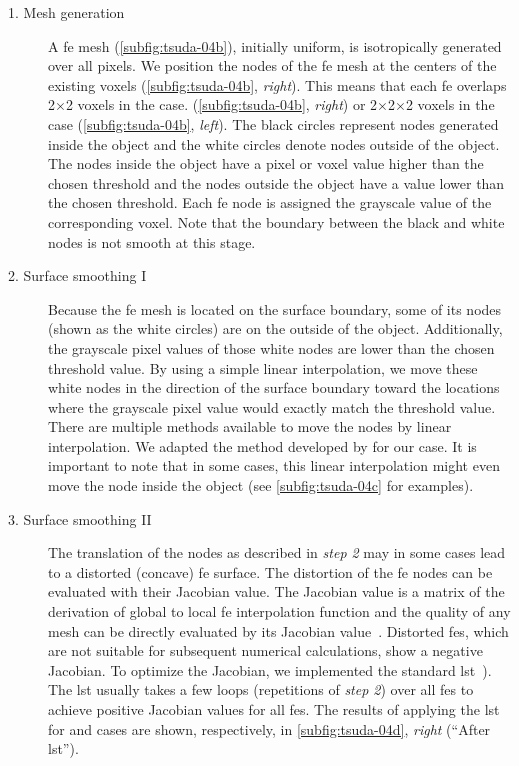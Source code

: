 \begin{description}
	\item[1. Mesh generation] A \ac{fe} mesh (\autoref{subfig:tsuda-04b}), initially uniform, is isotropically generated over all pixels. We position the nodes of the \ac{fe} mesh at the centers of the existing voxels (\autoref{subfig:tsuda-04b}, \emph{right}). This means that each \ac{fe} overlaps 2$\times$2 voxels in the \twod case. (\autoref{subfig:tsuda-04b}, \emph{right}) or 2$\times$2$\times$2 voxels in the \threed case (\autoref{subfig:tsuda-04b}, \emph{left}). The black circles represent nodes generated inside the object and the white circles denote nodes outside of the object. The nodes inside the object have a pixel or voxel value higher than the chosen threshold and the nodes outside the object have a value lower than the chosen threshold. Each \ac{fe} node is assigned the grayscale value of the corresponding voxel. Note that the boundary between the black and white nodes is not smooth at this stage.
	\item[2. Surface smoothing I] Because the \ac{fe} mesh is located on the surface boundary, some of its nodes (shown as the white circles) are on the outside of the object. Additionally, the grayscale pixel values of those white nodes are lower than the chosen threshold value. By using a simple linear interpolation, we move these white nodes in the direction of the surface boundary toward the locations where the grayscale pixel value would exactly match the threshold value. There are multiple methods available to move the nodes by linear interpolation. We adapted the method developed by \citet{Schneiders1996} for our \threed case. It is important to note that in some cases, this linear interpolation might even move the node inside the object (see \autoref{subfig:tsuda-04c} for examples).
	\item[3. Surface smoothing II] The translation of the nodes as described in \emph{step 2} may in some cases lead to a distorted (concave) \ac{fe} surface. The distortion of the \ac{fe} nodes can be evaluated with their Jacobian value. The Jacobian value is a matrix of the derivation of global to local \ac{fe} interpolation function and the quality of any mesh can be directly evaluated by its Jacobian value~\cite{Bathe1995}. Distorted \acp{fe}, which are not suitable for subsequent numerical calculations, show a negative Jacobian. To optimize the Jacobian, we implemented the standard \ac{lst}~\cite{Freitag2000}). The \ac{lst} usually takes a few loops (repetitions of \emph{step 2}) over all \acp{fe} to achieve positive Jacobian values for all \acp{fe}. The results of applying the \ac{lst} for \threed and \twod cases are shown, respectively, in \autoref{subfig:tsuda-04d}, \emph{right} (``After \ac{lst}'').
\end{description}


